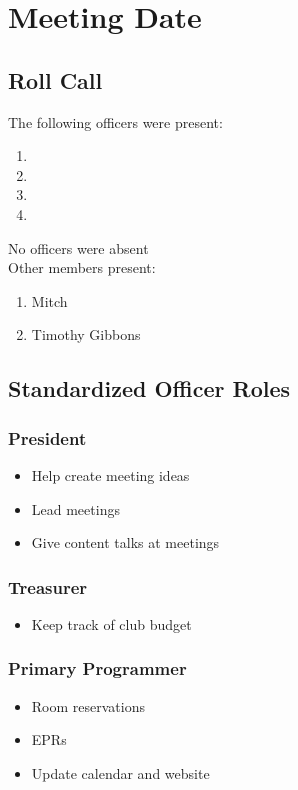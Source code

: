 \section{Meeting Date}

\subsection{Roll Call}

The following officers were present:

\begin{enumerate}
    \item \president
    \item \tresurer
    \item \primaryprogrammer
    \item \secretary
\end{enumerate}

No officers were absent
\\
Other members present:
\begin{enumerate}
    \item Mitch
    \item Timothy Gibbons
\end{enumerate}

\subsection{Standardized Officer Roles}
    \subsubsection{President}
        \begin{itemize}
            \item Help create meeting ideas
            \item Lead meetings
            \item Give content talks at meetings
        \end{itemize}
    \subsubsection{Treasurer}
        \begin{itemize}
            \item Keep track of club budget
        \end{itemize}
    \subsubsection{Primary Programmer}
        \begin{itemize}
            \item Room reservations
            \item EPRs
            \item Update calendar and website
        \end{itemize}
